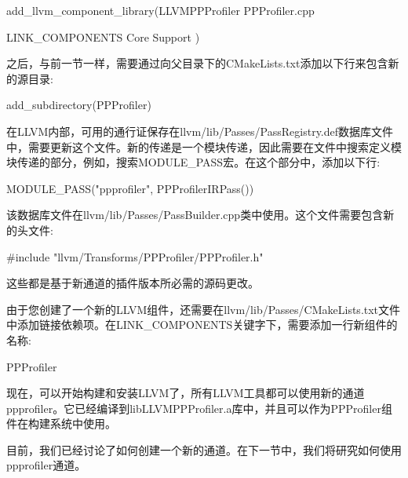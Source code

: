 \begin{cmake}
add_llvm_component_library(LLVMPPProfiler
    PPProfiler.cpp

    LINK_COMPONENTS
    Core
    Support
)
\end{cmake}

之后，与前一节一样，需要通过向父目录下的CMakeLists.txt添加以下行来包含新的源目录:

\begin{cmake}
add_subdirectory(PPProfiler)
\end{cmake}

在LLVM内部，可用的通行证保存在llvm/lib/Passes/PassRegistry.def数据库文件中，需要更新这个文件。新的传递是一个模块传递，因此需要在文件中搜索定义模块传递的部分，例如，搜索MODULE\_PASS宏。在这个部分中，添加以下行:

\begin{shell}
MODULE_PASS("ppprofiler", PPProfilerIRPass())
\end{shell}

该数据库文件在llvm/lib/Passes/PassBuilder.cpp类中使用。这个文件需要包含新的头文件:

\begin{cpp}
#include "llvm/Transforms/PPProfiler/PPProfiler.h"
\end{cpp}

这些都是基于新通道的插件版本所必需的源码更改。

由于您创建了一个新的LLVM组件，还需要在llvm/lib/Passes/CMakeLists.txt文件中添加链接依赖项。在LINK\_COMPONENTS关键字下，需要添加一行新组件的名称:

\begin{shell}
PPProfiler
\end{shell}

现在，可以开始构建和安装LLVM了，所有LLVM工具都可以使用新的通道ppprofiler。它已经编译到libLLVMPPProfiler.a库中，并且可以作为PPProfiler组件在构建系统中使用。

目前，我们已经讨论了如何创建一个新的通道。在下一节中，我们将研究如何使用ppprofiler通道。









